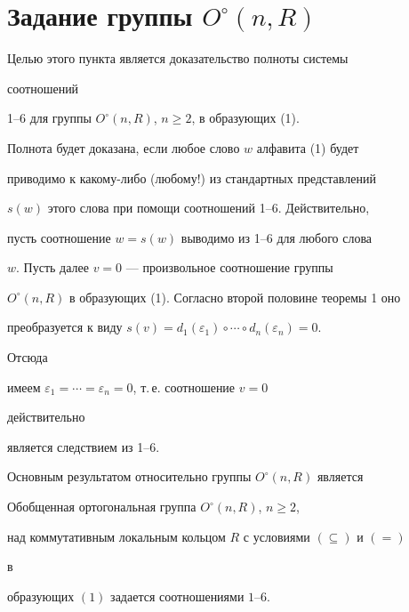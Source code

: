 

 


\section{Задание группы $O^\circ(n,R)$} 


 


Целью этого пункта является доказательство полноты системы 


соотношений 


1--6 для группы $O^\circ(n,R)$, $n\ge2$, в образующих (1). 


Полнота будет доказана, если любое слово $w$ алфавита (1) будет 


приводимо к какому-либо (любому!) из стандартных представлений 


$s(w)$ этого слова при помощи соотношений 1--6. Действительно, 


пусть соотношение $w=s(w)$ выводимо из 1--6 для любого слова 


$w$. Пусть далее $v=0$ --- произвольное соотношение группы 


$O^\circ(n,R)$ в образующих (1). Согласно второй половине теоремы 1 оно 


преобразуется к виду $s(v)=d_1(\varepsilon_1)\circ\dotsb\circ 


d_n(\varepsilon_n)=0$. 


Отсюда 


имеем $\varepsilon_1=\dotsb=\varepsilon_n=0$, т.\,е. соотношение $v=0$ 


действительно 


является следствием из 1--6. 


 


Основным результатом относительно группы $O^\circ(n,R)$ является 


 


\begin{thm} 


Обобщенная ортогональная группа $O^\circ(n,R)$, $n\ge2$, 


над коммутативным локальным кольцом $R$ с условиями $(\subseteq)$ и $(=)$ 


в 


образующих $(1)$ задается соотношениями $1$--$6$. 


\end{thm} 


